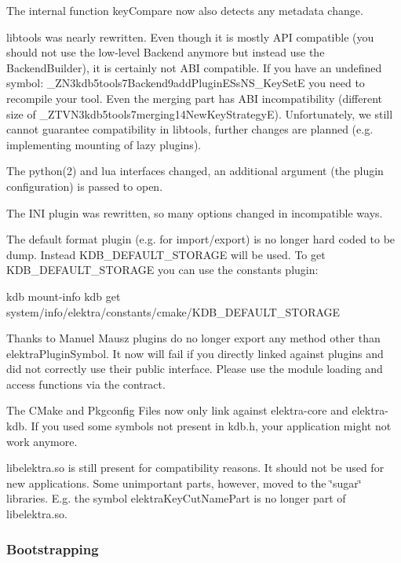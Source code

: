 The internal function {\ttfamily key\+Compare} now also detects any metadata change.

libtools was nearly rewritten. Even though it is mostly A\+PI compatible (you should not use the low-\/level {\ttfamily Backend} anymore but instead use the {\ttfamily Backend\+Builder}), it is certainly not A\+BI compatible. If you have an undefined symbol\+: {\ttfamily \+\_\+\+Z\+N3kdb5tools7\+Backend9add\+Plugin\+E\+Ss\+N\+S\+\_\+Key\+SetE} you need to recompile your tool. Even the merging part has A\+BI incompatibility (different size of {\ttfamily \+\_\+\+Z\+T\+V\+N3kdb5tools7merging14\+New\+Key\+StrategyE}). Unfortunately, we still cannot guarantee compatibility in {\ttfamily libtools}, further changes are planned (e.\+g. implementing mounting of lazy plugins).

The python(2) and lua interfaces changed, an additional argument (the plugin configuration) is passed to {\ttfamily open}.

The I\+NI plugin was rewritten, so many options changed in incompatible ways.

The default format plugin (e.\+g. for import/export) is no longer hard coded to be {\ttfamily dump}. Instead K\+D\+B\+\_\+\+D\+E\+F\+A\+U\+L\+T\+\_\+\+S\+T\+O\+R\+A\+GE will be used. To get K\+D\+B\+\_\+\+D\+E\+F\+A\+U\+L\+T\+\_\+\+S\+T\+O\+R\+A\+GE you can use the constants plugin\+: \begin{DoxyVerb}    kdb mount-info
    kdb get system/info/elektra/constants/cmake/KDB_DEFAULT_STORAGE
\end{DoxyVerb}


Thanks to Manuel Mausz plugins do no longer export any method other than {\ttfamily elektra\+Plugin\+Symbol}. It now will fail if you directly linked against plugins and did not correctly use their public interface. Please use the module loading and access functions via the contract.

The C\+Make and Pkgconfig Files now only link against {\ttfamily elektra-\/core} and {\ttfamily elektra-\/kdb}. If you used some symbols not present in {\ttfamily kdb.\+h}, your application might not work anymore.

{\ttfamily libelektra.\+so} is still present for compatibility reasons. It should not be used for new applications. Some unimportant parts, however, moved to the \char`\"{}sugar\char`\"{} libraries. E.\+g. the symbol {\ttfamily elektra\+Key\+Cut\+Name\+Part} is no longer part of {\ttfamily libelektra.\+so}.

\subsubsection*{Bootstrapping}

